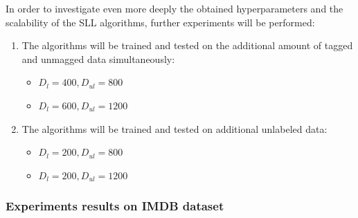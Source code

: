 \documentclass[12pt]{article}
\theoremstyle{definition}
\DeclareRobustCommand{\[}{\begin{equation}}
\DeclareRobustCommand{\]}{\end{equation}}
\begin{document}
In order to investigate even more deeply the obtained hyperparameters and the scalability of the SLL algorithms, further experiments will be performed:
    \begin{enumerate}
        \item The algorithms will be trained and tested on the additional amount of tagged and unmagged data simultaneously:
            \begin{itemize}
                \item $D_l = 400, D_{ul} = 800$
                \item $D_l = 600, D_{ul} = 1200$
            \end{itemize}
        \item The algorithms will be trained and tested on additional unlabeled data:
            \begin{itemize}
                    \item $D_l = 200, D_{ul} = 800$
                    \item $D_l = 200, D_{ul} = 1200$
            \end{itemize}
    \end{enumerate}

\subsubsection{Experiments results on IMDB dataset}
\end{document}
